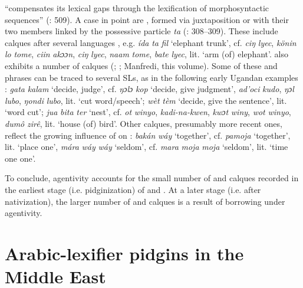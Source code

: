 \documentclass[output=paper]{langsci/langscibook}
\begin{document}
  “compensates its lexical gaps through the lexification of  morphosyntactic sequences”  (\citealt{ToscoManfredi2013}: 509). A case in point are   , formed via juxtaposition or with their two members linked by the possessive particle \textit{ta} (\citealt{Manfredi2014relex}: 308–309). These include calques after several  languages \citep[136]{Nakao2012}, e.g. \textit{ída} \textit{ta} \textit{fil} ‘elephant trunk’, cf.  \textit{ciŋ} \textit{lyec},  \textit{könin} \textit{lo} \textit{tome},  \textit{ciin} \textit{akɔɔn},  \textit{ciŋ} \textit{lyec},  \textit{naam} \textit{tome},  \textit{bate} \textit{lyec}, lit. ‘arm (of) elephant’.  also exhibits a number of calques (\citealt{Nakao2012}; \citealt{Avram2017talk}; Manfredi, this volume). Some of these  and phrases can be traced to several SLs, as in the following early Ugandan  examples \citep{Avram2017talk}: \textit{gata} \textit{kalam} ‘decide, judge’, cf.  \textit{ŋɔlɔ} \textit{kop} ‘decide, give judgment’,  \textit{ad'oci} \textit{kudo},  \textit{ŋɔl} \textit{lubo},  \textit{ŋondi} \textit{lubo}, lit. ‘cut word/speech’;  \textit{wèt} \textit{tèm} ‘decide, give the sentence’, lit. ‘word cut’; \textit{jua} \textit{bita} \textit{ter} ‘nest’, cf.  \textit{ot} \textit{winyo},  \textit{kadi-na-kwen},  \textit{kwɔt} \textit{winy},  \textit{wot} \textit{winyo},  \textit{dumô} \textit{zirê}, lit. ‘house (of) bird’. Other calques, presumably more recent ones, reflect the growing influence of  on  \citep[315]{Luffin2014}: \textit{bakán} \textit{wá}\textit{y} ‘together’, cf.  \textit{pamoja} ‘together’, lit. ‘place one’, \textit{mára} \textit{wá}\textit{y} \textit{wáy} ‘seldom’, cf.  \textit{mara} \textit{moja} \textit{moja} ‘seldom’, lit. ‘time one one’.

To conclude,  agentivity accounts for the small number of  and calques recorded in the earliest stage (i.e. pidginization) of   and . At a later stage (i.e. after nativization), the larger number of  and calques is a result of borrowing under  agentivity.


 \section{Arabic-lexifier pidgins in the Middle East}\label{sec:pid}
\end{document}
